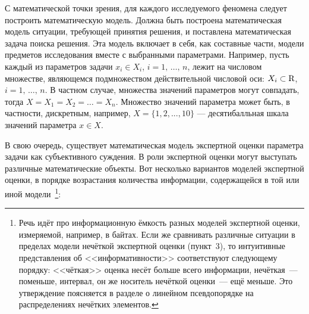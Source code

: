 С математической точки зрения, для каждого исследуемого феномена следует построить математическую модель. Должна быть построена математическая модель ситуации, требующей принятия решения, и поставлена математическая задача поиска решения. Эта модель включает в себя, как составные части, модели предметов исследования вместе с выбранными параметрами. Например, пусть каждый из параметров задачи $x_i \in X_i$,  $i=1,\, \ldots,\, n$, лежит на числовом множестве, являющемся подмножеством действительной числовой оси: $X_i \subset {\mathrm{R}}$, $i=1,\, \ldots,\, n$. В частном случае, множества значений параметров могут совпадать, тогда $X = X_1 = X_2 = \ldots = X_n$. Множество значений параметра может быть, в частности, дискретным, например, $X = \{1, 2, ..., 10\}$ --- десятибалльная шкала значений параметра $x \in X$.

В свою очередь, существует математическая модель экспертной оценки параметра задачи как субъективного суждения. В роли экспертной оценки могут выступать различные математические объекты. Вот несколько вариантов моделей экспертной оценки,  в порядке возрастания количества информации, содержащейся в той или иной модели~\footnote{Речь идёт про информационную ёмкость разных моделей экспертной оценки, измеряемой, например, в байтах. Если же сравнивать различные ситуации в пределах модели нечёткой экспертной оценки (пункт~3), то интуитивные представления об <<информативности>> соответствуют следующему порядку: <<чёткая>> оценка несёт больше всего информации, нечёткая~--- поменьше, интервал, он же носитель нечёткой оценки~--- ещё меньше. Это утверждение поясняется в разделе  о линейном псевдопорядке на распределениях нечётких элементов.}: 
